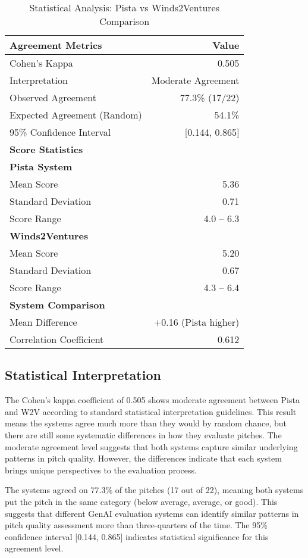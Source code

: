 \begin{table}[h]
\centering
\caption{Statistical Analysis: Pista vs Winds2Ventures Comparison}
\label{tab:comprehensive-results}
\begin{tabular}{lr}
\hline
\textbf{Agreement Metrics} & \textbf{Value} \\
\hline
Cohen's Kappa & 0.505 \\
Interpretation & Moderate Agreement \\
Observed Agreement & 77.3\% (17/22) \\
Expected Agreement (Random) & 54.1\% \\
95\% Confidence Interval & [0.144, 0.865] \\
\hline
\textbf{Score Statistics} & \\
\hline
\textbf{Pista System} & \\
Mean Score & 5.36 \\
Standard Deviation & 0.71 \\
Score Range & 4.0 -- 6.3 \\
\hline
\textbf{Winds2Ventures} & \\
Mean Score & 5.20 \\
Standard Deviation & 0.67 \\
Score Range & 4.3 -- 6.4 \\
\hline
\textbf{System Comparison} & \\
Mean Difference & +0.16 (Pista higher) \\
Correlation Coefficient & 0.612 \\
\hline
\end{tabular}
\end{table}

\subsection{Statistical Interpretation}

The Cohen's kappa coefficient of 0.505 shows moderate agreement between Pista and W2V according to standard statistical interpretation guidelines. This result means the systems agree much more than they would by random chance, but there are still some systematic differences in how they evaluate pitches. The moderate agreement level suggests that both systems capture similar underlying patterns in pitch quality. However, the differences indicate that each system brings unique perspectives to the evaluation process.

The systems agreed on 77.3\% of the pitches (17 out of 22), meaning both systems put the pitch in the same category (below average, average, or good). This suggests that different GenAI evaluation systems can identify similar patterns in pitch quality assessment more than three-quarters of the time. The 95\% confidence interval [0.144, 0.865] indicates statistical significance for this agreement level.

